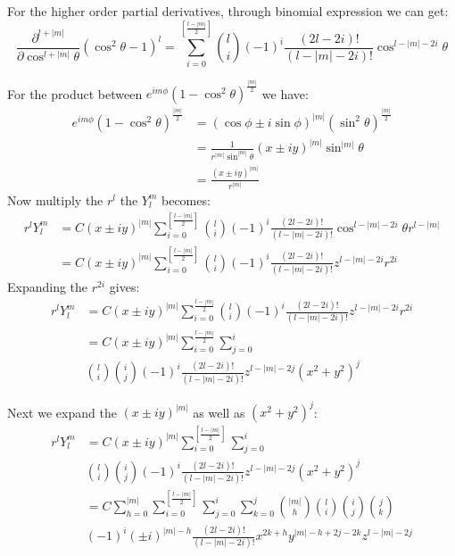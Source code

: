 For the higher order partial derivatives, through binomial expression we can get:
\begin{equation}
\frac{\partial^{l+|m|}}{\partial\cos^{l+|m|}\theta}(\cos^{2}\theta-1)^{l} = 
\sum_{i=0}^{\left[ \frac{l-|m|}{2}\right]}\binom{l}{i}(-1)^{i}\frac{(2l-2i)!}{(l-|m|-2i)!}
\cos^{l-|m|-2i}\theta
\label{int_transform_pure_cart_eq:6}
\end{equation}

For the product between $e^{im\phi}(1-\cos^{2}\theta)^{\frac{|m|}{2}}$ we have:
\begin{equation}
 \begin{split}
 e^{im\phi}(1-\cos^{2}\theta)^{\frac{|m|}{2}} &=  
(\cos\phi\pm i\sin\phi)^{|m|}(\sin^{2}\theta)^{\frac{|m|}{2}} \\
&=\frac{1}{r^{|m|}\sin^{|m|}\theta}(x\pm iy)^{|m|}\sin^{|m|}\theta \\
&=\frac{(x \pm iy)^{|m|}}{r^{|m|}} 
 \end{split}
\label{int_transform_pure_cart_eq:7}
\end{equation}
Now multiply the $r^{l}$ the $Y^{m}_{l}$ becomes:
\begin{align}
 r^{l}Y^{m}_{l} &= C(x\pm iy)^{|m|}
\sum_{i=0}^{\left[ \frac{l-|m|}{2}\right] }
\binom{l}{i}(-1)^{i}\frac{(2l-2i)!}{(l-|m|-2i)!}\cos^{l-|m|-2i}\theta r^{l-|m|} \nonumber \\
&=  C(x\pm iy)^{|m|}
\sum_{i=0}^{\left[ \frac{l-|m|}{2}\right] }
\binom{l}{i}(-1)^{i}\frac{(2l-2i)!}{(l-|m|-2i)!}z^{l-|m|-2i}r^{2i}
\label{int_transform_pure_cart_eq:8}
\end{align}
Expanding the $r^{2i}$ gives:
\begin{equation}
\begin{split}
 r^{l}Y^{m}_{l} &=  C(x\pm iy)^{|m|}
\sum_{i=0}^{\frac{l-|m|}{2}}\binom{l}{i}(-1)^{i}\frac{(2l-2i)!}{(l-|m|-2i)!}z^{l-|m|-2i}r^{2i} \\
&= C(x\pm iy)^{|m|}
\sum_{i=0}^{\frac{l-|m|}{2}}\sum_{j=0}^{i} \\
&\binom{l}{i}\binom{i}{j}(-1)^{i}\frac{(2l-2i)!}{(l-|m|-2i)!}z^{l-|m|-2j}(x^{2}+y^{2})^{j}
\end{split}
\label{int_transform_pure_cart_eq:9} 
\end{equation}

Next we expand the $(x\pm iy)^{|m|}$ as well as $(x^{2}+y^{2})^{j}$:
\begin{equation}
 \begin{split}
 r^{l}Y^{m}_{l} &=  C(x\pm iy)^{|m|}
\sum_{i=0}^{\left[ \frac{l-|m|}{2}\right] }\sum_{j=0}^{i} \\
&\binom{l}{i}\binom{i}{j}(-1)^{i}\frac{(2l-2i)!}{(l-|m|-2i)!}z^{l-|m|-2j}(x^{2}+y^{2})^{j} \\
&= C\sum_{h=0}^{|m|}\sum_{i=0}^{\left[ \frac{l-|m|}{2}\right] }\sum_{j=0}^{i}\sum_{k=0}^{j} 
\binom{|m|}{h}\binom{l}{i}\binom{i}{j}\binom{j}{k} \\
&(-1)^{i}(\pm i)^{|m|-h}\frac{(2l-2i)!}{(l-|m|-2i)!} x^{2k+h}y^{|m|-h+2j-2k}z^{l-|m|-2j}
 \end{split}
\label{int_transform_pure_cart_eq:10} 
\end{equation}

